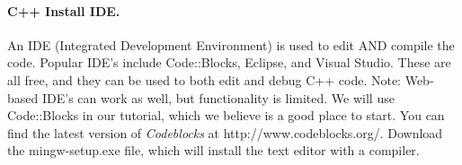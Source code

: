 \paragraph{C++ Install IDE.}
An IDE (Integrated Development Environment) is used to edit AND compile the code.
Popular IDE's include Code::Blocks, Eclipse, and Visual Studio. These are all free, and they can be used to both edit and debug C++ code.
Note: Web-based IDE's can work as well, but functionality is limited.
We will use Code::Blocks in our tutorial, which we believe is a good place to start.
You can find the latest version of \textit{Codeblocks} at http://www.codeblocks.org/. Download the mingw-setup.exe file, which will install the text editor with a compiler.



